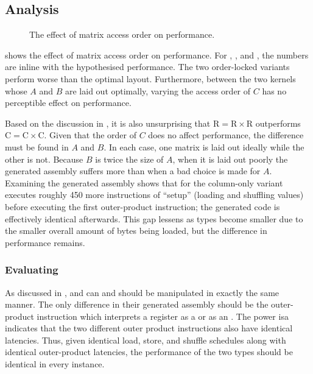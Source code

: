 \documentclass[\main/thesis.tex]{subfiles}
\begin{document}
\subsection{Analysis}
\begin{figure}[t]
  \centering
  
  \caption{The effect of matrix access order on performance.}
  \label{fig:accessOrder}
\end{figure}

 shows the effect of matrix access order on performance.
For , , and , the numbers are inline with the hypothesised performance.
The two order-locked variants perform worse than the optimal layout.
Furthermore, between the two kernels whose $A$ and $B$ are laid out optimally, varying the access order of $C$ has no perceptible effect on performance.

Based on the discussion in , it is also unsurprising that $\textrm{R} = \textrm{R} \times \textrm{R}$ outperforms $\textrm{C} = \textrm{C} \times \textrm{C}$.
Given that the order of $C$ does no affect performance, the difference must be found in $A$ and $B$.
In each case, one matrix is laid out ideally while the other is not.
Because $B$ is twice the size of $A$, when it is laid out poorly the generated assembly suffers more than when a bad choice is made for $A$.
Examining the generated assembly shows that for  the column-only variant executes roughly 450 more instructions of ``setup'' (loading and shuffling values) before executing the first outer-product instruction; the generated code is effectively identical afterwards.
This gap lessens as types become smaller due to the smaller overall amount of bytes being loaded, but the difference in performance remains.

\subsubsection{Evaluating \texorpdfstring{}{half}}
As discussed in ,  and  can and should be manipulated in exactly the same manner.
The only difference in their generated assembly should be the outer-product instruction which interprets a register as a  or as an .
The \gls{power} \gls{isa} indicates that the two different outer product instructions also have identical latencies.
Thus, given identical load, store, and shuffle schedules along with identical outer-product latencies, the performance of the two types should be identical in every instance.
\end{document}
